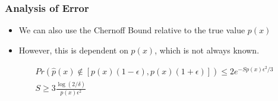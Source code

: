 \documentclass{beamer}
\begin{document}
\begin{frame}
  \frametitle{Analysis of Error}
  \begin{itemize}
    \item We can also use the Chernoff Bound relative to the true value $p(x)$
    \item However, this is dependent on $p(x)$, which is not always known.
  \end{itemize}
  \begin{gather*}
    Pr \left( \hat{p}(x) \not\in \left[p(x)(1 - \epsilon), p(x)(1 + \epsilon) \right] \right) \leq 2 e^{-S p(x) \epsilon^2 / 3} \\
    S \geq 3 \frac{\log \left(2 / \delta \right)}{p(x) \epsilon^2} \\
  \end{gather*}
\end{frame}

\end{document}
